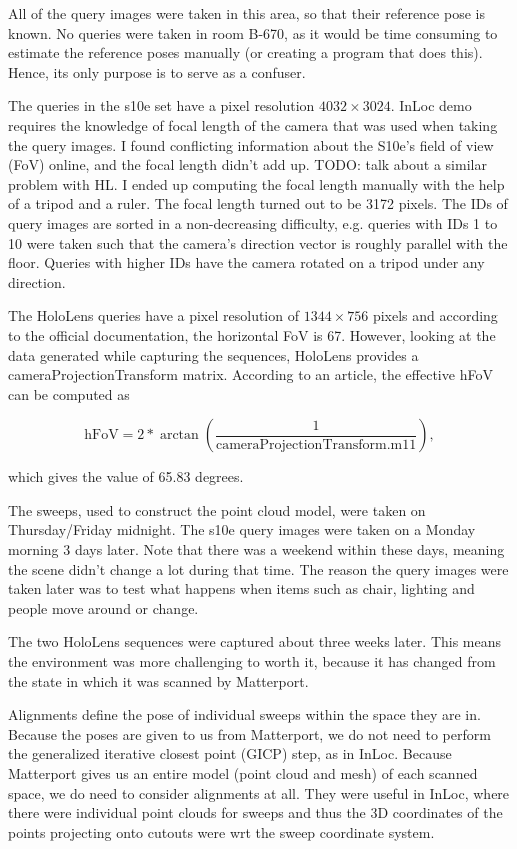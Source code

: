 \documentclass[twoside]{ctuthesis}
\theoremstyle{plain}
\theoremstyle{definition}
\theoremstyle{note}
\begin{document}
All of the query images were taken in this area, so that their reference pose is known. No queries were taken in room B-670, as it would be time consuming to estimate the reference poses manually (or creating a program that does this). Hence, its only purpose is to serve as a confuser.

The queries in the s10e set have a pixel resolution $4032 \times 3024$. InLoc demo requires the knowledge of focal length of the camera that was used when taking the query images. I found conflicting information about the S10e's field of view (FoV) online, and the focal length didn't add up. TODO: talk about a similar problem with HL. I ended up computing the focal length manually with the help of a tripod and a ruler. The focal length turned out to be 3172 pixels. The IDs of query images are sorted in a non-decreasing difficulty, e.g. queries with IDs 1 to 10 were taken such that the camera's direction vector is roughly parallel with the floor. Queries with higher IDs have the camera rotated on a tripod under any direction.

The HoloLens queries have a pixel resolution of $1344 \times 756$ pixels and according to the official documentation, the horizontal FoV is 67\degree. However, looking at the data generated while capturing the sequences, HoloLens provides a cameraProjectionTransform matrix. According to an article, the effective hFoV can be computed as

\begin{equation}
	\text{hFoV} = 2*\arctan \left(\frac{1}{\text{cameraProjectionTransform.m11}}\right),
\end{equation}

which gives the value of 65.83 degrees.

The sweeps, used to construct the point cloud model, were taken on Thursday/Friday midnight. The s10e query images were taken on a Monday morning 3 days later. Note that there was a weekend within these days, meaning the scene didn't change a lot during that time. The reason the query images were taken later was to test what happens when items such as chair, lighting and people move around or change.

The two HoloLens sequences were captured about three weeks later. This means the environment was more challenging to worth it, because it has changed from the state in which it was scanned by Matterport.

Alignments define the pose of individual sweeps within the space they are in. Because the poses are given to us from Matterport, we do not need to perform the generalized iterative closest point (GICP) step, as in InLoc. Because Matterport gives us an entire model (point cloud and mesh) of each scanned space, we do need to consider alignments at all. They were useful in InLoc, where there were individual point clouds for sweeps and thus the 3D coordinates of the points projecting onto cutouts were wrt the sweep coordinate system.
\end{document}
